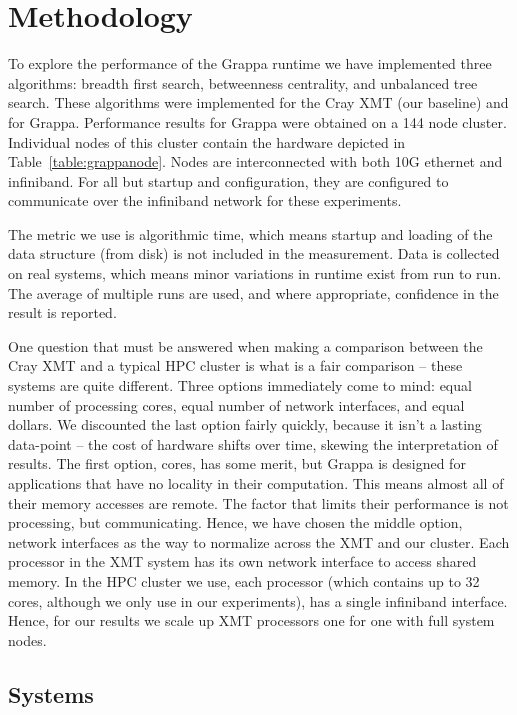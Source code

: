 \section{Methodology} \label{sec:method}

To explore the performance of the Grappa runtime we have implemented three algorithms: breadth first search, betweenness centrality, and unbalanced tree search.  These algorithms were implemented for the Cray XMT (our baseline) and for Grappa.  Performance results for Grappa were obtained on a 144 node cluster.  Individual nodes of this cluster contain the hardware depicted in Table~\ref{table:grappanode}.  Nodes are interconnected with both 10G ethernet and infiniband.  For all but startup and configuration, they are configured to communicate over the infiniband network for these experiments.

The metric we use is algorithmic time, which means startup and loading of the data structure (from disk) is not included in the measurement.  Data is collected on real systems, which means minor variations in runtime exist from run to run.  The average of multiple runs are used, and where appropriate, confidence in the result is reported.

One question that must be answered when making a comparison between the
Cray XMT and a typical HPC cluster is what is a fair comparison -- these
systems are quite different.  Three options immediately come to mind:
equal number of processing cores, equal number of network interfaces,
and equal dollars.  We discounted the last option fairly quickly,
because it isn't a lasting data-point -- the cost of hardware shifts
over time, skewing the interpretation of results.  The first option,
cores, has some merit, but Grappa is designed for applications that have
no locality in their computation.  This means almost all of their memory
accesses are remote.  The factor that limits their performance is not
processing, but communicating.  Hence, we have chosen the middle option,
network interfaces as the way to normalize across the XMT and our
cluster.  Each processor in the XMT system has its own network interface
to access shared memory.  In the HPC cluster we use, each processor
(which contains up to 32 cores, although we only use  in our
experiments), has a single infiniband interface.  Hence, for our results
we scale up XMT processors one for one with full system nodes.



\subsection{Systems}

